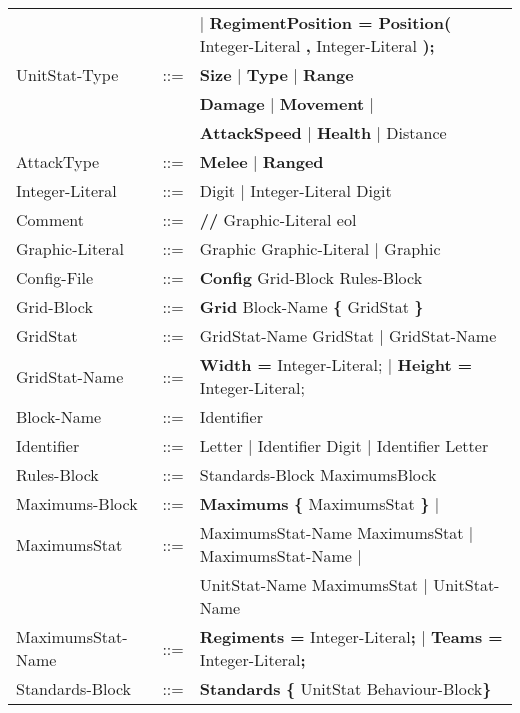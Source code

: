 \begin{center}
\begin{longtable}{ l l l }
								   &		 & $\mid$ {\bf RegimentPosition = Position(} Integer-Literal {\bf ,} Integer-Literal {\bf );}\\
				UnitStat-Type	   &	::=	 & {\bf Size} $\mid$ {\bf Type} $\mid$ {\bf  Range} \\
								   &	     & {\bf Damage} $\mid$ {\bf Movement } $\mid$ \\
								   &		 & {\bf AttackSpeed} $\mid$ {\bf Health} $\mid$ Distance\\
				AttackType		   &    ::=  & {\bf Melee} $\mid$ {\bf Ranged} \\
				Integer-Literal    &	::=  & Digit $\mid$ Integer-Literal Digit \\
				Comment			   &	::=	 & {\bf //} Graphic-Literal eol \\
				Graphic-Literal	   &	::=	 & Graphic Graphic-Literal $\mid$ Graphic \\
				Config-File		   & 	::=  & {\bf Config} Grid-Block Rules-Block  		\\
				Grid-Block		   &	::=	 & {\bf Grid} Block-Name	 {\bf \{} GridStat \bf{\}} \\
				GridStat		   &	::=  & GridStat-Name GridStat $\mid$ GridStat-Name   \\
				GridStat-Name	   &	::=  & {\bf Width = } Integer-Literal; $\mid$ {\bf Height = } Integer-Literal; \\
				Block-Name		   &	::=  & Identifier							\\
				Identifier		   &    ::=  & Letter $\mid$ Identifier Digit $\mid$ Identifier Letter \\
				Rules-Block		   &	::=	 & Standards-Block MaximumsBlock 				\\
				Maximums-Block	   &	::=	 & {\bf Maximums} {\bf \{} MaximumsStat {\bf \}} $\mid$ \\
				MaximumsStat	   &	::=  & MaximumsStat-Name MaximumsStat $\mid$ MaximumsStat-Name $\mid$		\\
								   &	     & UnitStat-Name MaximumsStat $\mid$ UnitStat-Name			\\
				MaximumsStat-Name  &	::=  & {\bf Regiments = } Integer-Literal{\bf ;} $\mid$ {\bf Teams = } Integer-Literal{\bf ;} \\
				Standards-Block	   &    ::=  & {\bf Standards} {\bf \{ } UnitStat Behaviour-Block\bf{\} }		\\
				\end{longtable}
		\end{center}
		
